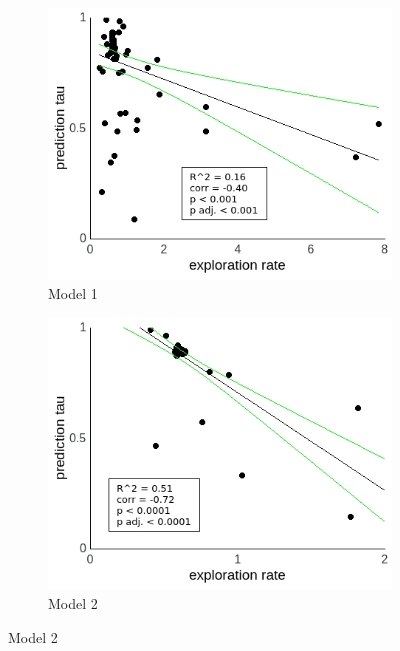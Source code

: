 \documentclass[a4paper]{scrreprt}
\begin{document}
\begin{figure}
\centering
\begin{subfigure}[b]{0.49\textwidth}
        \includegraphics[width=\textwidth]{figs/sec3/temp/temp_pred_mod1.jpeg}
        \caption{Model 1}
    \end{subfigure}
    \begin{subfigure}[b]{0.49\textwidth}
        \includegraphics[width=\textwidth]{figs/sec3/temp/temp_pred_mod2.jpeg}
        \caption{Model 2}
    \end{subfigure}


\end{figure}
\end{document}
